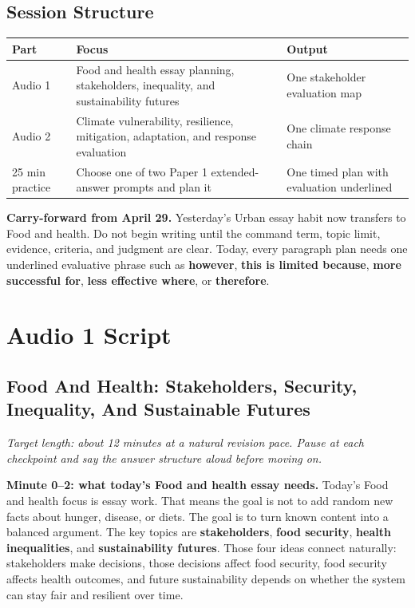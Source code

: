 \documentclass[11pt,a4paper]{article}
\newcommand{\term}[1]{\textcolor{HeadingBlue}{\textbf{#1}}}
\newcommand{\boxnote}[3]{%
\noindent\colorbox{#1}{%
  \begin{minipage}{0.965\textwidth}
  \sffamily
  \textbf{\textcolor{HeadingBlue}{#2}} #3
  \end{minipage}
}}
\begin{document}
\subsection{Session Structure}

\begin{tabularx}{\textwidth}{L{0.18\textwidth}Y L{0.25\textwidth}}
\toprule
\textbf{Part} & \textbf{Focus} & \textbf{Output} \\
\midrule
Audio 1 & Food and health essay planning, stakeholders, inequality, and
sustainability futures & One stakeholder evaluation map \\
Audio 2 & Climate vulnerability, resilience, mitigation, adaptation, and
response evaluation & One climate response chain \\
25 min practice & Choose one of two Paper 1 extended-answer prompts and plan it
& One timed plan with evaluation underlined \\
\bottomrule
\end{tabularx}

\boxnote{SoftTint}{Carry-forward from April 29.}{Yesterday's Urban essay habit
now transfers to Food and health. Do not begin writing until the command term,
topic limit, evidence, criteria, and judgment are clear. Today, every paragraph
plan needs one underlined evaluative phrase such as \term{however},
\term{this is limited because}, \term{more successful for}, \term{less
effective where}, or \term{therefore}.}

\section{Audio 1 Script}

\subsection{Food And Health: Stakeholders, Security, Inequality, And Sustainable Futures}

\textit{Target length: about 12 minutes at a natural revision pace. Pause at
each checkpoint and say the answer structure aloud before moving on.}

\textbf{Minute 0--2: what today's Food and health essay needs.}
Today's Food and health focus is essay work. That means the goal is not to add
random new facts about hunger, disease, or diets. The goal is to turn known
content into a balanced argument. The key topics are \term{stakeholders},
\term{food security}, \term{health inequalities}, and \term{sustainability
futures}. Those four ideas connect naturally: stakeholders make decisions,
those decisions affect food security, food security affects health outcomes,
and future sustainability depends on whether the system can stay fair and
resilient over time.
\end{document}
